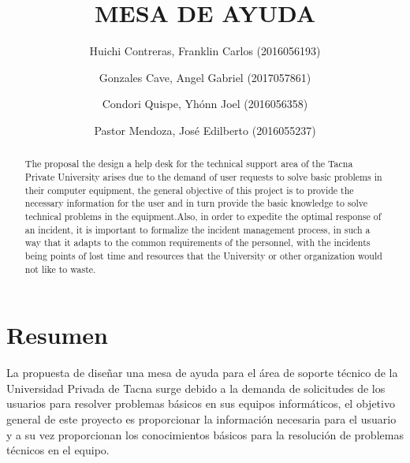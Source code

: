\documentclass[preprint,12pt]{elsarticle}
\begin{document}
	
	\begin{frontmatter} 

		\title{\huge MESA DE AYUDA}
		
		\author{Huichi Contreras, Franklin Carlos            (2016056193)}
		\author{Gonzales Cave, Angel Gabriel                 (2017057861)}
		\author{Condori Quispe, Yhónn Joel	         	   (2016056358)} 
		\author{Pastor Mendoza, José Edilberto              (2016055237)} 
		\address{Escuela Profesional de Ingeniería de Sistemas}
		\address{Universidad Privada de Tacna}
		\address{Tacna, Perú}
		

		\begin{abstract}
The proposal the design a help desk for the technical support area of the Tacna Private University arises due to the demand of user requests to solve basic problems in their computer equipment, the general objective of this project is to provide the necessary information for the user and in turn provide the basic knowledge to solve technical problems in the equipment.Also, in order to expedite the optimal response of an incident, it is important to formalize the incident management process, in such a way that it adapts to the common requirements of the personnel, with the incidents being points of lost time and resources that the University or other organization would not like to waste.

		\end{abstract}


	\end{frontmatter}


\section{Resumen}
La propuesta de diseñar una mesa de ayuda para el área de soporte técnico de la Universidad Privada de Tacna surge debido a la demanda de solicitudes de los usuarios para resolver problemas básicos en sus equipos informáticos, el objetivo general de este proyecto es proporcionar la información necesaria para el usuario y a su vez proporcionan los conocimientos básicos para la resolución de problemas técnicos en el equipo.
\end{document}

